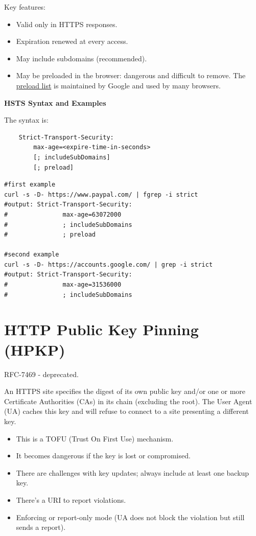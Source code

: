 \vspace{0.2cm}

Key features:
\begin{itemize}
    \item Valid only in HTTPS responses.
    \item Expiration renewed at every access.
    \item May include subdomains (recommended).
    \item May be preloaded in the browser: dangerous and difficult to remove. The \href{https://hstspreload.org/}{preload list} is maintained by Google and used by many browsers.
\end{itemize}

\begin{center}
    \textbf{HSTS Syntax and Examples}
\end{center}

The syntax is:
\begin{verbatim}
    Strict-Transport-Security:
        max-age=<expire-time-in-seconds>
        [; includeSubDomains]
        [; preload]
\end{verbatim}

\begin{lstlisting}[style=bashStyle]
#first example
curl -s -D- https://www.paypal.com/ | fgrep -i strict
#output: Strict-Transport-Security: 
#               max-age=63072000 
#               ; includeSubDomains
#               ; preload

#second example
curl -s -D- https://accounts.google.com/ | grep -i strict
#output: Strict-Transport-Security:
#               max-age=31536000
#               ; includeSubDomains
\end{lstlisting}

\section{HTTP Public Key Pinning (HPKP)}
\begin{center}
    RFC-7469 - deprecated.
\end{center}
An HTTPS site specifies the digest of its own public key and/or one or more Certificate Authorities (CAs) in its chain (excluding the root). The User Agent (UA) caches this key and will refuse to connect to a site presenting a different key.

\begin{itemize}
\item This is a TOFU (Trust On First Use) mechanism.
\item It becomes dangerous if the key is lost or compromised.
\item There are challenges with key updates; always include at least one backup key.
\item There's a URI to report violations.
\item Enforcing or report-only mode (UA does not block the violation but still sends a report).
\end{itemize}

